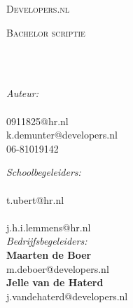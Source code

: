 \documentclass[
11pt, %
english, %
singlespacing, %
liststotoc, %
headsepline, %
]{formatting} %
\begin{document}

\begin{titlepage}
	\begin{center}
		{\scshape\LARGE Developers.nl\par}\vspace{0.5cm}
		{\scshape\LARGE \univname\par}\vspace{1.5cm} %
		\textsc{\Large Bachelor scriptie}\\[0.5cm] %
		
		\HRule \\[0.4cm] %
		{\huge \bfseries \ttitle\par}\vspace{0.4cm} %
		\HRule \\[1.5cm] %
		
		\begin{minipage}[t]{0.4\textwidth}
			\begin{flushleft} \large
				\emph{Auteur:}\\\textbf{\authorname}\\
				0911825@hr.nl\\
				k.demunter@developers.nl\\
				06-81019142\\
			\end{flushleft}
		\end{minipage}
		\begin{minipage}[t]{0.4\textwidth}
			\begin{flushright} \large
				\emph{Schoolbegeleiders:}\\
				\textbf{\techsupname}\\
				t.ubert@hr.nl\\
				\textbf{\skillssupname}\\
				j.h.i.lemmens@hr.nl\\[0.3cm]
				
				\emph{Bedrijfsbegeleiders:}\\
				\textbf{Maarten de Boer}\\
				m.deboer@developers.nl\\
				\textbf{Jelle van de Haterd}\\
				j.vandehaterd@developers.nl
			\end{flushright}
		\end{minipage}\\[2cm]
		

\end{center}
\end{titlepage}
\end{document}
